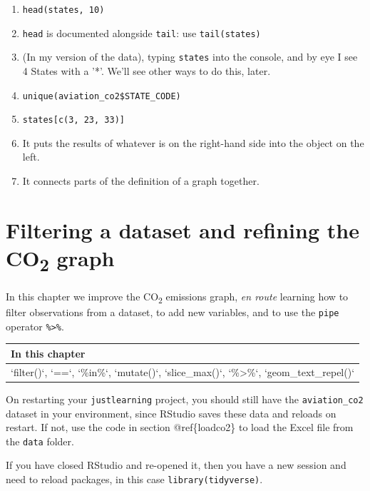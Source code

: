 \documentclass[
]{book}
\providecommand{\tightlist}{%
  \setlength{\itemsep}{0pt}\setlength{\parskip}{0pt}}
\begin{document}
\begin{enumerate}
\def\labelenumi{\arabic{enumi})}
\tightlist
\item
  \texttt{head(states,\ 10)}
\item
  \texttt{head} is documented alongside \texttt{tail}: use \texttt{tail(states)}
\item
  (In my version of the data), typing \texttt{states} into the console, and by eye I see 4 States with a '*'. We'll see other ways to do this, later.
\item
  \texttt{unique(aviation\_co2\$STATE\_CODE)}
\item
  \texttt{states{[}c(3,\ 23,\ 33){]}}
\item
  It puts the results of whatever is on the right-hand side into the object on the left.
\item
  It connects parts of the definition of a graph together.
\end{enumerate}

\hypertarget{filtering-a-dataset-and-refining-the-co2-graph}{%
\chapter{\texorpdfstring{Filtering a dataset and refining the CO\textsubscript{2} graph}{Filtering a dataset and refining the CO2 graph}}\label{filtering-a-dataset-and-refining-the-co2-graph}}

In this chapter we improve the CO\textsubscript{2} emissions graph, \emph{en route} learning how to filter observations from a dataset, to add new variables, and to use the \texttt{pipe} operator \texttt{\%\textgreater{}\%}.

\begin{tabular}{l}
\hline
In this chapter\\
\hline
`filter()`, `==`, `\%in\%`, `mutate()`, `slice\_max()`, `\%>\%`, `geom\_text\_repel()`\\
\hline
\end{tabular}

On restarting your \texttt{justlearning} project, you should still have the \texttt{aviation\_co2} dataset in your environment, since RStudio saves these data and reloads on restart. If not, use the code in section @ref\{loadco2\} to load the Excel file from the \texttt{data} folder.

If you have closed RStudio and re-opened it, then you have a new session and need to reload packages, in this case \texttt{library(tidyverse)}.
\end{document}
